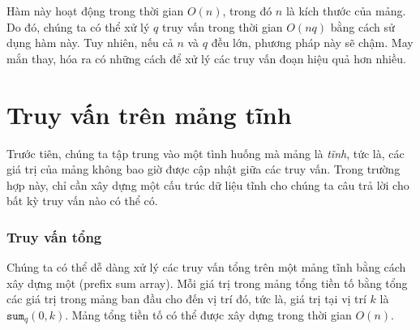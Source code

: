 Hàm này hoạt động trong thời gian $O(n)$,
trong đó $n$ là kích thước của mảng.
Do đó, chúng ta có thể xử lý $q$ truy vấn trong
thời gian $O(nq)$ bằng cách sử dụng hàm này.
Tuy nhiên, nếu cả $n$ và $q$ đều lớn, phương pháp này
sẽ chậm. May mắn thay, hóa ra có những
cách để xử lý các truy vấn đoạn hiệu quả hơn nhiều.

\section{Truy vấn trên mảng tĩnh}

Trước tiên, chúng ta tập trung vào một tình huống mà
mảng là \emph{tĩnh}, tức là,
các giá trị của mảng không bao giờ được cập nhật giữa các truy vấn.
Trong trường hợp này, chỉ cần xây dựng
một cấu trúc dữ liệu tĩnh cho chúng ta
câu trả lời cho bất kỳ truy vấn nào có thể có.

\subsubsection{Truy vấn tổng}


Chúng ta có thể dễ dàng xử lý
các truy vấn tổng trên một mảng tĩnh
bằng cách xây dựng một  (prefix sum array).
Mỗi giá trị trong mảng tổng tiền tố bằng
tổng các giá trị trong mảng ban đầu cho đến vị trí đó,
tức là, giá trị tại vị trí $k$ là $\texttt{sum}_q(0,k)$.
Mảng tổng tiền tố có thể được xây dựng trong thời gian $O(n)$.

